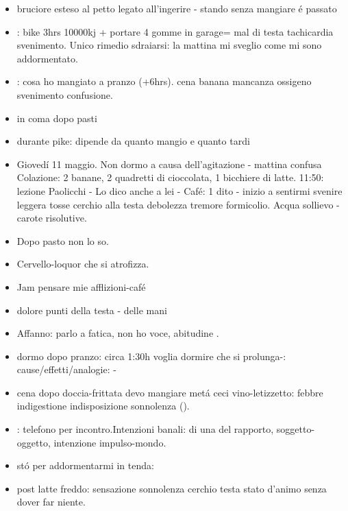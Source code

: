 \begin{itemize}
\item bruciore esteso al petto legato all'ingerire - stando senza mangiare \'e passato
\item {}: bike 3hrs 10000kj + portare 4 gomme in garage= mal di testa tachicardia svenimento. Unico rimedio sdraiarsi: la mattina mi sveglio come mi sono addormentato.
\item {}: cosa ho mangiato a pranzo (+6hrs). cena banana mancanza ossigeno svenimento confusione.
\item in coma dopo pasti
\item {} durante pike: dipende da quanto mangio  e quanto tardi
\item {} Gioved\'i 11 maggio. 
Non dormo a causa dell'agitazione - mattina confusa 
Colazione: 2 banane, 2 quadretti di cioccolata, 1 bicchiere di latte.
11:50: lezione Paolicchi - Lo dico anche a lei - Caf\'e: 1 dito - inizio a sentirmi svenire leggera tosse cerchio alla testa debolezza tremore formicolio.
Acqua sollievo - carote risolutive.
\item {} Dopo pasto non lo so.
\item Cervello-loquor che si atrofizza.
\item Jam pensare mie afflizioni-caf\'e
\item dolore punti della testa - delle mani
\item Affanno: parlo a fatica, non ho voce, abitudine .
\item dormo dopo pranzo: circa 1:30h voglia dormire che si prolunga-: cause/effetti/analogie:  -
\item cena dopo doccia-frittata devo mangiare met\'a ceci vino-letizzetto: febbre indigestione indisposizione sonnolenza ().
\item {}: telefono per incontro.Intenzioni banali:  di una  del rapporto, soggetto-oggetto, intenzione impulso-mondo.
\item st\'o per addormentarmi in tenda:   
\item post latte freddo: sensazione sonnolenza cerchio testa stato d'animo  senza dover far niente.

\end{itemize}

